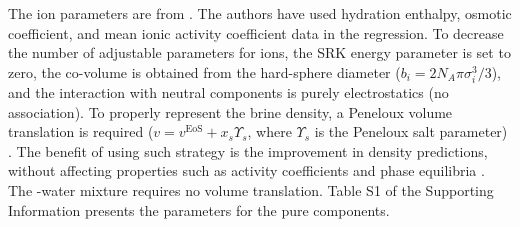 The ion parameters are from \citeauthor{Maribo2015} \cite{Maribo2015}. The authors have used hydration enthalpy, osmotic coefficient, and mean ionic activity coefficient data in the regression. To decrease the number of adjustable parameters for ions, the SRK energy parameter is set to zero, the co-volume is obtained from the hard-sphere diameter ($b_i=2N_A \pi \sigma_i^3/3$),  and the interaction with neutral components is purely electrostatics (no association). To properly represent the brine density, a Peneloux volume translation is required ($v = v^\text{EoS} + x_s \Upsilon_s$, where $\Upsilon_s$ is the Peneloux salt parameter) \cite{Maribo2015}.  The benefit of using such strategy is the improvement in density predictions, without affecting properties such as activity coeﬃcients and phase equilibria \cite{Olsen2021}. The -water mixture requires no volume translation. Table S1 of the Supporting Information presents the parameters for the pure components.


